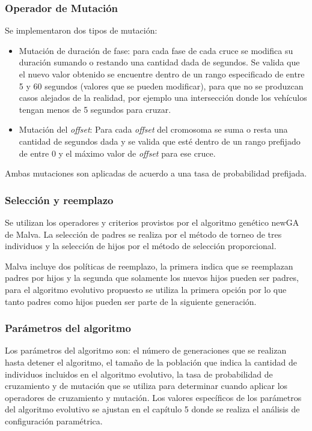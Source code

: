 \subsubsection{Operador de Mutación}
Se implementaron dos tipos de mutación:
\begin{itemize}
	
	\item Mutación de duración de fase: para cada fase de cada cruce se modifica su duración sumando o restando una cantidad dada de segundos. Se valida que el nuevo valor obtenido se encuentre dentro de un rango especificado de entre 5 y 60 segundos (valores que se pueden modificar), para que no se produzcan casos alejados de la realidad, por ejemplo una intersección donde los vehículos tengan menos de 5 segundos para cruzar.
	
	\item Mutación del \emph{offset}: Para cada \emph{offset} del cromosoma se suma o resta una cantidad de segundos dada y se valida que esté dentro de un rango prefijado de entre 0 y el máximo valor de \emph{offset} para ese cruce.
	

\end{itemize}
Ambas mutaciones son aplicadas de acuerdo a una tasa de probabilidad prefijada.

\subsubsection{Selección y reemplazo}
Se  utilizan los operadores y criterios provistos por el algoritmo genético newGA de Malva. La selección de padres se realiza por el método de torneo de tres individuos y la selección de hijos por el método de selección proporcional. 

Malva incluye dos políticas de reemplazo, la primera indica que se reemplazan padres por hijos y la segunda que solamente los nuevos hijos pueden ser padres, para el algoritmo evolutivo propuesto se utiliza la primera opción por lo que tanto padres como hijos pueden ser parte de la siguiente generación.

\subsubsection{Parámetros del algoritmo}
Los parámetros del algoritmo son: el número de generaciones que se realizan hasta detener el algoritmo, el tamaño de la población que indica la cantidad de individuos incluidos en el algoritmo evolutivo, la tasa de probabilidad de cruzamiento y de mutación que se utiliza para determinar cuando aplicar los operadores de cruzamiento y mutación. Los valores específicos de los parámetros del algoritmo evolutivo se ajustan en el capítulo 5 donde se realiza el análisis de configuración paramétrica. 

